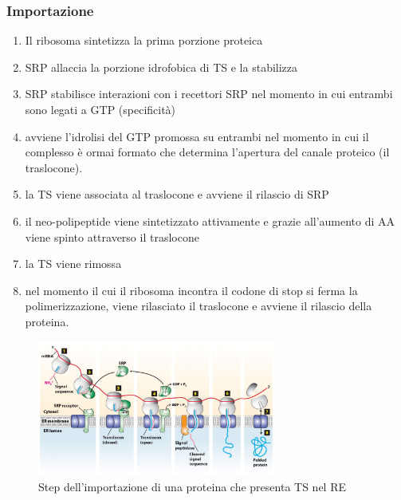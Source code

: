             \subsubsection{Importazione}
                \begin{enumerate}
                    \item Il ribosoma sintetizza la prima porzione proteica
                    \item SRP allaccia la porzione idrofobica di TS e la stabilizza
                    \item SRP stabilisce interazioni con i recettori SRP nel momento in cui entrambi sono legati a GTP (specificità)
                    \item avviene l'idrolisi del GTP promossa su entrambi nel momento in cui il complesso è ormai formato che determina l'apertura del canale proteico (il traslocone).
                    \item la TS viene associata al traslocone e avviene il rilascio di SRP
                    \item il neo-polipeptide viene sintetizzato attivamente e grazie all'aumento di AA viene spinto attraverso il traslocone
                    \item la TS viene rimossa
                    \item nel momento il cui il ribosoma incontra il codone di stop si ferma la polimerizzazione, viene rilasciato il traslocone e avviene il rilascio della proteina.
                \end{enumerate}
                \begin{figure}[h]
                    \centering
                    \includegraphics[width=0.7\textwidth]{images/importazioneRE.JPG}
                    \caption{\small Step dell'importazione di una proteina che presenta TS nel RE}
                    \label{fig:mesh1}
                \end{figure}
        
